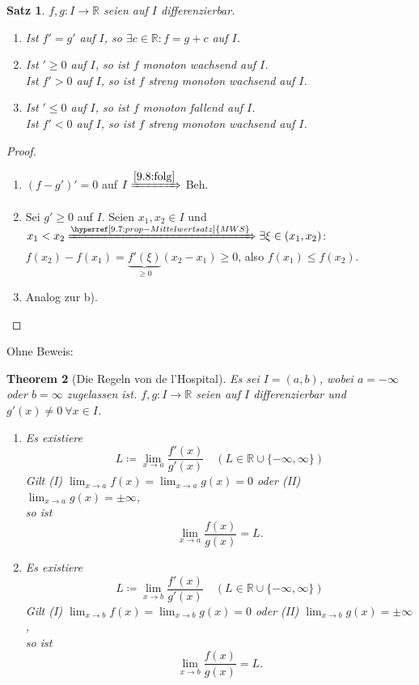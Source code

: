 \documentclass[titlepage,ngerman,a4paper,headsepline]{scrartcl}
\newcommand{\R}{\mathbb{R}}
\theoremstyle{named}
\newtheorem{namedtheorem}{Theorem} \counterwithin{namedtheorem}{section}
\theoremstyle{dotless}
\newtheorem{satz}[namedtheorem]{Satz}
\begin{document}
\begin{satz} \label{9.10:satz}
	$f, g \colon I \rightarrow \R$ seien auf $I$ differenzierbar.
	\begin{enumerate}
		\item Ist $f' = g'$ auf $I$, so $\exists c \in \R: f = g + c$ auf $I$.
		\item Ist $' \geq 0$ auf $I$, so ist $f$ monoton wachsend auf $I$. \\
				Ist $f' > 0$ auf $I$, so ist $f$ streng monoton wachsend auf $I$.
		\item Ist $' \leq 0$ auf $I$, so ist $f$ monoton fallend auf $I$. \\
				Ist $f' < 0$ auf $I$, so ist $f$ streng monoton wachsend auf $I$.
	\end{enumerate}
\end{satz}

\begin{proof}  ~\
	\begin{enumerate}
		\item $(f - g')' = 0$ auf $I \xRightarrow[]{\ref{9.8:folg}}$ Beh.
		\item Sei $g' \geq 0$ auf $I$. Seien $x_{1}, x_{2} \in I$ und $x_{1} < x_{2} \xRightarrow[]{\hyperref[9.7:prop-Mittelwertsatz]{MWS}} \exists \xi \in (x_{1}, x_{2})$: $f(x_{2}) - f(x_{1}) = \underbrace{f'(\xi)}_{\geq 0} (x_{2} - x_{1}) \geq 0$, also $f(x_{1}) \leq f(x_{2})$.
		\item Analog zur b).
	\end{enumerate}
\end{proof}

Ohne Beweis:
\begin{namedtheorem}[Die Regeln von de l'Hospital] \label{9.11:prop:lHopital}
	Es sei $I = (a, b)$, wobei $a = -\infty$ oder $b = \infty$ zugelassen ist. $f, g \colon I \rightarrow \R$ seien auf $I$ differenzierbar und $g'(x) \neq 0 ~\forall x \in I$. 
	\begin{enumerate}
		\item Es existiere
	$$ L \coloneqq \lim_{x \rightarrow a} \frac{f'(x)}{g'(x)} \quad  (L \in \R \cup \{ - \infty, \infty \}) $$
	Gilt (I) $\lim_{x \rightarrow a} f(x) = \lim_{x \rightarrow a} g(x) = 0$ oder (II) $\lim_{x \rightarrow a} g(x) = \pm \infty$, \\
	so ist 
	$$ \lim_{x \rightarrow a} \frac{f(x)}{g(x)} = L. $$
		\item Es existiere
	$$ L \coloneqq \lim_{x \rightarrow b} \frac{f'(x)}{g'(x)} \quad  (L \in \R \cup \{ - \infty, \infty \}) $$
	Gilt (I) $\lim_{x \rightarrow b} f(x) = \lim_{x \rightarrow b} g(x) = 0$ oder (II) $\lim_{x \rightarrow b} g(x) = \pm \infty$, \\
	so ist 
	$$ \lim_{x \rightarrow b} \frac{f(x)}{g(x)} = L. $$
	\end{enumerate}
	
\end{namedtheorem}
\end{document}
